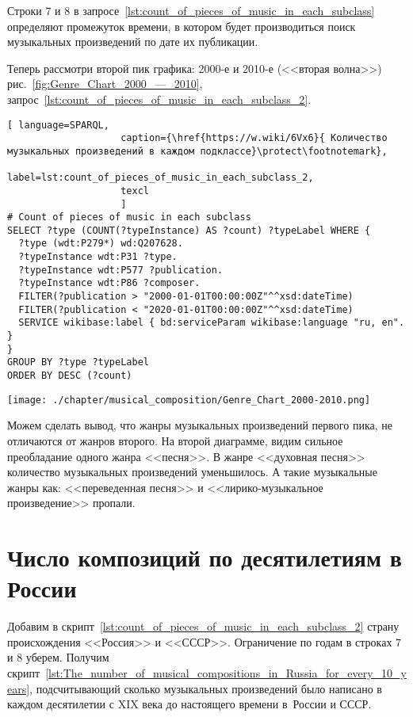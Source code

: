 Строки 7 и 8 в запросе~\ref{lst:count_of_pieces_of_music_in_each_subclass} определяют промежуток времени, в котором будет производиться поиск музыкальных произведений по дате их публикации.


\newpage
Теперь рассмотри второй пик графика: 2000-е и 2010-е (<<вторая волна>>) рис.~\ref{fig:Genre_Chart_2000_—_2010}, запрос~\ref{lst:count_of_pieces_of_music_in_each_subclass_2}.

\begin{lstlisting}[ language=SPARQL,
                    caption={\href{https://w.wiki/6Vx6}{ Количество музыкальных произведений в каждом подклассе}\protect\footnotemark},
                    label=lst:count_of_pieces_of_music_in_each_subclass_2,
                    texcl 
                    ]
# Count of pieces of music in each subclass
SELECT ?type (COUNT(?typeInstance) AS ?count) ?typeLabel WHERE {
  ?type (wdt:P279*) wd:Q207628.
  ?typeInstance wdt:P31 ?type.
  ?typeInstance wdt:P577 ?publication.
  ?typeInstance wdt:P86 ?composer.
  FILTER(?publication > "2000-01-01T00:00:00Z"^^xsd:dateTime)        
  FILTER(?publication < "2020-01-01T00:00:00Z"^^xsd:dateTime)
  SERVICE wikibase:label { bd:serviceParam wikibase:language "ru, en". }
}
GROUP BY ?type ?typeLabel
ORDER BY DESC (?count)
\end{lstlisting}%

\begin{marginfigure}[0\baselineskip]
	\texttt{[image: ./chapter/musical\_composition/Genre\_Chart\_2000-2010.png]}
	\caption[Круговая диаграмма музыкальных жанров за 2000--2010 годы во всем мире]{Круговая диаграмма музыкальных жанров за 2000--2010 годы во всем мире. Ссылка на SPARQL-запрос: \href{https://w.wiki/6Vx6}{https://w.wiki/6Vx6}.}%
	\label{fig:Genre_Chart_2000_—_2010}%
\end{marginfigure}

Можем сделать вывод, что жанры музыкальных произведений первого пика, не отличаются от жанров второго. На второй диаграмме, видим сильное преобладание одного жанра <<песня>>. В жанре <<духовная песня>> количество музыкальных произведений уменьшилось. А такие музыкальные жанры как: <<переведенная песня>> и <<лирико-музыкальное произведение>> пропали.


\newpage
\section{Число композиций по десятилетиям в России}
Добавим в скрипт~\ref{lst:count_of_pieces_of_music_in_each_subclass_2} страну происхождения <<Россия>> и <<СССР>>. Ограничение по годам в строках 7 и 8 уберем. Получим скрипт~\ref{lst:The_number_of_musical_compositions_in_Russia_for_every_10_years}, подсчитывающий сколько музыкальных произведений было написано в каждом десятилетии с XIX века до настоящего времени в~России и СССР.


